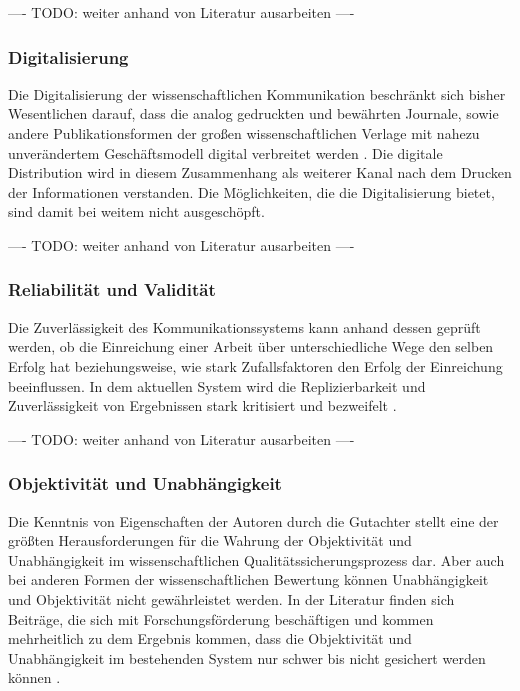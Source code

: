 ---- TODO: weiter anhand von Literatur ausarbeiten ----

\subsubsection{Digitalisierung}

Die Digitalisierung der wissenschaftlichen Kommunikation beschränkt sich bisher Wesentlichen darauf, dass die analog gedruckten und bewährten Journale, sowie andere Publikationsformen der großen wissenschaftlichen Verlage mit nahezu unverändertem Geschäftsmodell digital verbreitet werden \cite{Hanekop_2014}. Die digitale Distribution wird in diesem Zusammenhang als weiterer Kanal nach dem Drucken der Informationen verstanden. Die Möglichkeiten, die die Digitalisierung bietet, sind damit bei weitem nicht ausgeschöpft.

---- TODO: weiter anhand von Literatur ausarbeiten ----

\subsubsection{Reliabilität und Validität}

Die Zuverlässigkeit des Kommunikationssystems kann anhand dessen geprüft werden, ob die Einreichung einer Arbeit über unterschiedliche Wege den selben Erfolg hat beziehungsweise, wie stark Zufallsfaktoren den Erfolg der Einreichung beeinflussen. In dem aktuellen System wird die Replizierbarkeit und Zuverlässigkeit von Ergebnissen stark kritisiert und bezweifelt \cite{suchen}.

---- TODO: weiter anhand von Literatur ausarbeiten ----

\subsubsection{Objektivität und Unabhängigkeit}

Die Kenntnis von Eigenschaften der Autoren durch die Gutachter stellt eine der größten Herausforderungen für die Wahrung der Objektivität und Unabhängigkeit im wissenschaftlichen Qualitätssicherungsprozess dar. Aber auch bei anderen Formen der wissenschaftlichen Bewertung können Unabhängigkeit und Objektivität nicht gewährleistet werden. In der Literatur finden sich Beiträge, die sich mit Forschungsförderung beschäftigen und kommen mehrheitlich zu dem Ergebnis kommen, dass die Objektivität und Unabhängigkeit im bestehenden System nur schwer bis nicht gesichert werden können \cite{suchen}.

